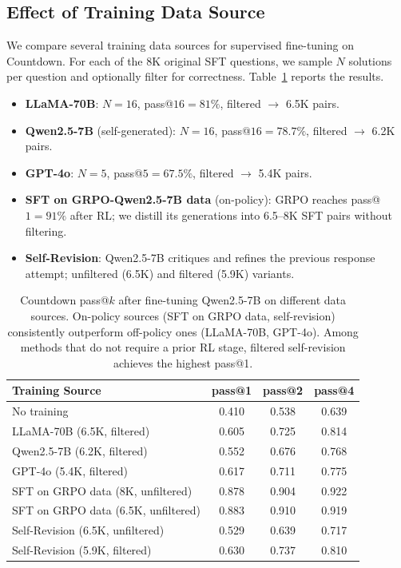  
\subsection{Effect of Training Data Source}
\label{app:countdown-sources}
 
We compare several training data sources for supervised fine-tuning on
Countdown.  For each of the 8K original SFT questions, we sample $N$ solutions per question and
optionally filter for correctness. Table~\ref{tab:countdown-sources} reports the results.
 
\begin{itemize}
\item \textbf{LLaMA-70B}: $N\!=\!16$, pass@$16 = 81\%$, filtered
      $\rightarrow$ 6.5K pairs.
\item \textbf{Qwen2.5-7B} (self-generated): $N\!=\!16$,
      pass@$16 = 78.7\%$, filtered $\rightarrow$ 6.2K pairs.
\item \textbf{GPT-4o}: $N\!=\!5$, pass@$5 = 67.5\%$, filtered
      $\rightarrow$ 5.4K pairs.
\item \textbf{SFT on GRPO-Qwen2.5-7B data} (on-policy): GRPO reaches
      pass@$1 = 91\%$ after RL; we distill its generations into
      6.5--8K SFT pairs without filtering.
\item \textbf{Self-Revision}: Qwen2.5-7B critiques and refines the previous
      response attempt; unfiltered (6.5K) and filtered
      (5.9K) variants.
\end{itemize}
 

 
\begin{table}[h]
\centering
\vspace{4pt}
\small
\begin{tabular}{lccc}
\toprule
\textbf{Training Source} & \textbf{pass@1} & \textbf{pass@2} & \textbf{pass@4} \\
\midrule
No training & 0.410 & 0.538 & 0.639 \\
\midrule
LLaMA-70B (6.5K, filtered) & 0.605 & 0.725 & 0.814 \\
Qwen2.5-7B (6.2K, filtered) & 0.552 & 0.676 & 0.768 \\
GPT-4o (5.4K, filtered) & 0.617 & 0.711 & 0.775 \\
\midrule
SFT on GRPO data (8K, unfiltered) & 0.878 & 0.904 & 0.922 \\
SFT on GRPO data (6.5K, unfiltered) & 0.883 & 0.910 & 0.919 \\
\midrule
Self-Revision (6.5K, unfiltered) & 0.529 & 0.639 & 0.717 \\
Self-Revision (5.9K, filtered) & 0.630 & 0.737 & 0.810 \\
\bottomrule
\end{tabular}
\caption{%
  Countdown pass@$k$ after fine-tuning Qwen2.5-7B on different data
  sources.  On-policy sources (SFT on GRPO data, self-revision)
  consistently outperform off-policy ones (LLaMA-70B, GPT-4o).  Among
  methods that do not require a prior RL stage, filtered self-revision
  achieves the highest pass@1.}
\label{tab:countdown-sources}
\end{table}
 
